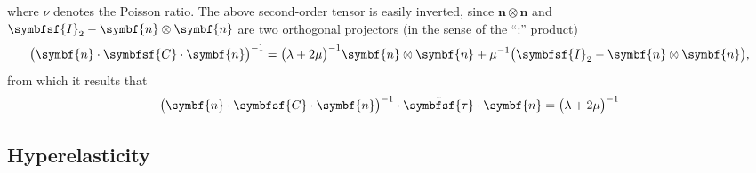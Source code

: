 \documentclass[draft, appendixprefix=true, chapterprefix=true, fontsize=12pt, numbers=noendperiod]{scrbook}
\newcommand{\dbldot}{\mathbin{\mathord{:}}}
\newcommand{\tens}[1]{\symbfsf{#1}}
\renewcommand{\vec}[1]{\symbf{#1}}
\begin{document}
where \(\nu\) denotes the Poisson ratio. The above second-order tensor is
easily inverted, since \(\vec n\otimes\vec n\) and
\(\tens I_2-\vec n\otimes\vec n\) are two orthogonal projectors (in the sense
of the ``\(\dbldot\)'' product)
\begin{equation}
  \label{eq:23}
  \bigl(\vec n\cdot\tens C\cdot\vec n\bigr)^{-1}=\bigl(\lambda+2\mu\bigr)^{-1}\vec n\otimes\vec n+\mu^{-1}\bigl(\tens I_2-\vec n\otimes\vec n\bigr),
\end{equation}
from which it results that
\begin{equation}
  \label{eq:24}
  \bigl(\vec n\cdot\tens C\cdot\vec n\bigr)^{-1}\cdot\tilde{\tens\tau}\cdot\vec n=\bigl(\lambda+2\mu\bigr)^{-1}
\end{equation}



\subsection{Hyperelasticity}
\end{document}
